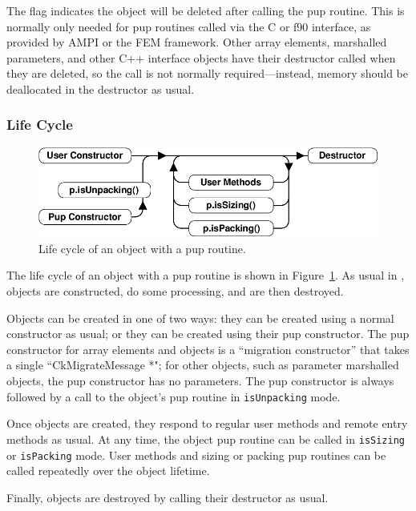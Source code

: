 The  flag indicates the object will be deleted
after calling the pup routine.  This is normally only needed for
pup routines called via the C or f90 interface, as provided by 
AMPI or the FEM framework.  Other \charmpp{} array elements, 
marshalled parameters, and other C++ interface objects 
have their destructor called when they are deleted, so the 
 call is not normally required---instead,
memory should be deallocated in the destructor as usual.


\subsubsection{Life Cycle}

\label{sec:lifecycle}

\begin{figure}[h]
\begin{center}
\includegraphics[width=6.0in]{fig/pup}
\end{center}
\caption{Life cycle of an object with a pup routine.}
\label{fig:pup}
\end{figure}

The life cycle of an object with a pup routine is shown in 
Figure~\ref{fig:pup}.  As usual in \CC{}, objects are 
constructed, do some processing, and are then destroyed.

Objects can be created in one of two ways: they can
be created using a normal constructor as usual; or they
can be created using their pup constructor.  The pup constructor
for \charmpp{} array elements and  objects
is a ``migration constructor'' that takes a single ``CkMigrateMessage *";
for other objects, such as parameter marshalled objects,
the pup constructor has no parameters.  The pup constructor
is always followed by a call to the object's pup routine in
\verb.isUnpacking. mode.

Once objects are created, they respond to regular user methods
and remote entry methods as usual.  At any time, the object 
pup routine can be called in \verb.isSizing. or \verb.isPacking.
mode.  User methods and sizing or packing pup routines can be called
repeatedly over the object lifetime.

Finally, objects are destroyed by calling their destructor
as usual.



